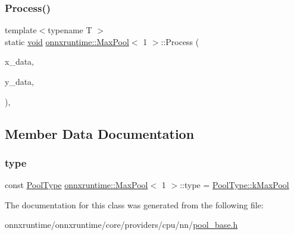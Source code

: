 \mbox{\label{classonnxruntime_1_1MaxPool_3_011_01_4_a02cd39e53eae93f41f8d10332e214b05}} 
\subsubsection{\texorpdfstring{Process()}{Process()}}
{\footnotesize\ttfamily template$<$typename T $>$ \\
static \mbox{\hyperlink{mlasi_8h_a88f941d423cb2a819b70a1358982b1a6}{void}} \mbox{\hyperlink{classonnxruntime_1_1MaxPool}{onnxruntime\+::\+Max\+Pool}}$<$ 1 $>$\+::Process (\begin{DoxyParamCaption}\item[{const T \&}]{x\+\_\+data,  }\item[{T \&}]{y\+\_\+data,  }\item[{const \mbox{\hyperlink{classonnxruntime_1_1PoolProcessContext}{Pool\+Process\+Context}} \&}]{ }\end{DoxyParamCaption})\hspace{0.3cm}{\ttfamily [inline]}, {\ttfamily [static]}}



\subsection{Member Data Documentation}
\mbox{\label{classonnxruntime_1_1MaxPool_3_011_01_4_a9fcb4025fec4b8807dc1237b820b4594}} 
\subsubsection{\texorpdfstring{type}{type}}
{\footnotesize\ttfamily const \mbox{\hyperlink{namespaceonnxruntime_aa4ff52f19ea8c4d3e4ce3ffbabbc7060}{Pool\+Type}} \mbox{\hyperlink{classonnxruntime_1_1MaxPool}{onnxruntime\+::\+Max\+Pool}}$<$ 1 $>$\+::type = \mbox{\hyperlink{namespaceonnxruntime_aa4ff52f19ea8c4d3e4ce3ffbabbc7060a5ff72b0901ac2c36434cfecb86f6d5ff}{Pool\+Type\+::k\+Max\+Pool}}\hspace{0.3cm}{\ttfamily [static]}}



The documentation for this class was generated from the following file\+:\begin{DoxyCompactItemize}
\item 
onnxruntime/onnxruntime/core/providers/cpu/nn/\mbox{\hyperlink{pool__base_8h}{pool\+\_\+base.\+h}}\end{DoxyCompactItemize}
